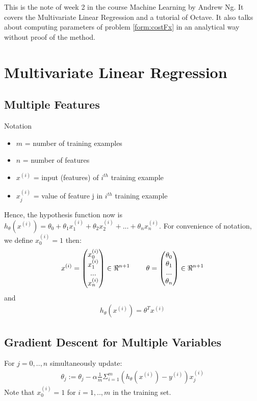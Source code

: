 This is the note of week 2 in the course Machine Learning by Andrew Ng. It covers the Multivariate Linear Regression and a tutorial of Octave. It also talks about computing parameters of problem \eqref{form:costFx} in an analytical way without proof of the method. 

\section{Multivariate Linear Regression}
\subsection{Multiple Features}
Notation
\begin{itemize}
 	\item $m$ = number of training examples
 	\item $n$ = number of features
 	\item $x^{(i)}$ = input (features) of $i^{th}$ training example
 	\item $x_{j}^{(i)}$ = value of feature j in $i^{th}$ training example
 \end{itemize} 

Hence, the hypothesis function now is $h_{\theta}(x^{(i)}) = \theta_0 + \theta_1 x_1^{(i)} + \theta_2 x_2^{(i)} + ... + \theta_n x_n^{(i)}$. For convenience of notation, we define $x_0^{(i)} = 1$ then:
\[
x^{(i)} = \begin{pmatrix}
x_0^{(i)} \\
x_1^{(i)} \\
... \\
x_n^{(i)}
\end{pmatrix} \in \Re^{n+1} \hspace{0.8cm} \theta = \begin{pmatrix}
\theta_0 \\
\theta_1 \\
... \\
\theta_n
\end{pmatrix} \in \Re^{n+1}
\]   
and
\begin{align}
\label{form:w2mulVarH}
h_\theta(x^{(i)}) = \theta^{T}x^{(i)}
\end{align}

\subsection{Gradient Descent for Multiple Variables}
For $j = 0,..,n $ simultaneously update:
\begin{align}
\label{form:w2mulVarGradDesc}
\theta_j := \theta_j - \alpha \frac{1}{m} \Sigma_{i=1}^{m} (h_{\theta}(x^{(i)}) - y^{(i)})x_j^{(i)}  
\end{align}
Note that $x_0^{(i)} = 1$ for $i = 1,..,m$ in the training set.

